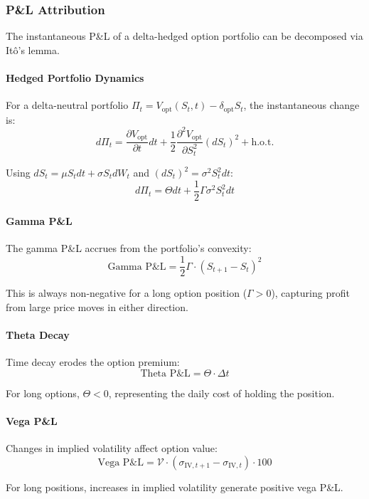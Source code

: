 \subsubsection{P\&L Attribution}

The instantaneous P\&L of a delta-hedged option portfolio can be decomposed via Itô's lemma.

\paragraph{Hedged Portfolio Dynamics}

For a delta-neutral portfolio $\Pi_t = V_{\text{opt}}(S_t, t) - \delta_{\text{opt}} S_t$, the instantaneous change is:
\[
d\Pi_t = \frac{\partial V_{\text{opt}}}{\partial t} dt + \frac{1}{2} \frac{\partial^2 V_{\text{opt}}}{\partial S_t^2} (dS_t)^2 + \text{h.o.t.}
\]

Using $dS_t = \mu S_t dt + \sigma S_t dW_t$ and $(dS_t)^2 = \sigma^2 S_t^2 dt$:
\[
d\Pi_t = \Theta dt + \frac{1}{2} \Gamma \sigma^2 S_t^2 dt
\]

\paragraph{Gamma P\&L}

The gamma P\&L accrues from the portfolio's convexity:
\[
\text{Gamma P\&L} = \frac{1}{2} \Gamma \cdot (S_{t+1} - S_t)^2
\]

This is always non-negative for a long option position ($\Gamma > 0$), capturing profit from large price moves in either direction.

\paragraph{Theta Decay}

Time decay erodes the option premium:
\[
\text{Theta P\&L} = \Theta \cdot \Delta t
\]

For long options, $\Theta < 0$, representing the daily cost of holding the position.

\paragraph{Vega P\&L}

Changes in implied volatility affect option value:
\[
\text{Vega P\&L} = \mathcal{V} \cdot (\sigma_{\text{IV},t+1} - \sigma_{\text{IV},t}) \cdot 100
\]

For long positions, increases in implied volatility generate positive vega P\&L.

